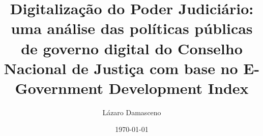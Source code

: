 \documentclass[12pt, a4paper]{report}
\begin{document}
\title{Digitalização do Poder Judiciário: uma análise das
políticas públicas de governo digital do Conselho Nacional de Justiça com base no E-Government Development Index} 

\author{Lázaro Damasceno}
\date{\today}
\maketitle

\listoffigures

\tableofcontents








\end{document}
